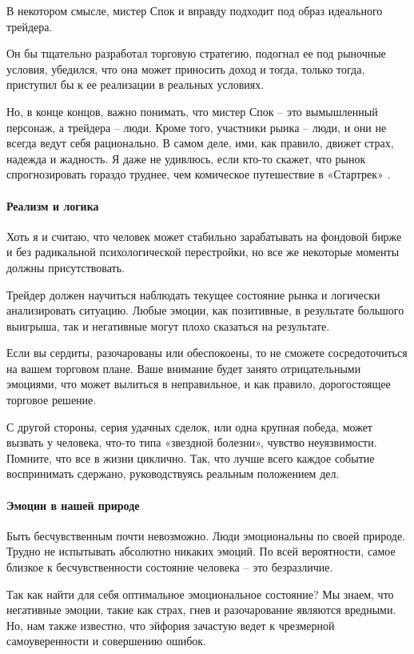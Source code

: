\documentclass[a5paper]{article}
\begin{document}
В некотором смысле, мистер Спок и вправду подходит под образ идеального трейдера.

Он бы тщательно разработал торговую стратегию, подогнал ее под рыночные условия, убедился, что она может приносить доход и тогда, только тогда, приступил бы к ее реализации в реальных условиях.

Но, в конце концов, важно понимать, что мистер Спок – это вымышленный
персонаж, а трейдера – люди. Кроме того, участники рынка – люди, и они
не всегда ведут себя рационально. В самом деле, ими, как правило,
движет страх, надежда и жадность. Я даже не удивлюсь, если кто-то
скажет, что рынок спрогнозировать гораздо труднее, чем комическое
путешествие в «Стартрек» .

\paragraph{Реализм и логика}

Хоть я и считаю, что человек может стабильно зарабатывать на фондовой бирже и без радикальной психологической перестройки, но все же некоторые моменты должны присутствовать.

Трейдер должен научиться наблюдать текущее состояние рынка и логически анализировать ситуацию. Любые эмоции, как позитивные, в результате большого выигрыша, так и негативные могут плохо сказаться на результате.

Если вы сердиты, разочарованы или обеспокоены, то не сможете сосредоточиться на вашем торговом плане. Ваше внимание будет занято отрицательными эмоциями, что может вылиться в неправильное, и как правило, дорогостоящее торговое решение.

С другой стороны, серия удачных сделок, или одна крупная победа, может
вызвать у человека, что-то типа «звездной болезни», чувство
неуязвимости. Помните, что все в жизни циклично. Так, что лучше всего
каждое событие воспринимать сдержано, руководствуясь реальным
положением дел.

\paragraph{Эмоции в нашей природе}

Быть бесчувственным почти невозможно. Люди эмоциональны по своей природе. Трудно не испытывать абсолютно никаких эмоций. По всей вероятности, самое близкое к бесчувственности состояние человека – это безразличие.

Так как найти для себя оптимальное эмоциональное состояние? Мы знаем, что негативные эмоции, такие как страх, гнев и разочарование являются вредными. Но, нам также известно, что эйфория зачастую ведет к чрезмерной самоуверенности и совершению ошибок.
\end{document}
